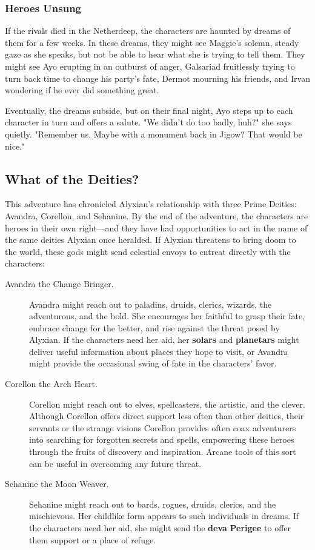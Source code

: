 \documentclass[a4paper, 11pt, bg=full, twocolumn, nooutline]{dndbook}
\begin{document}
\subsubsection{Heroes Unsung}

If the rivals died in the Netherdeep, the characters are haunted by dreams of them for a few weeks. In these dreams, they might see Maggie's solemn, steady gaze as she speaks, but not be able to hear what she is trying to tell them. They might see Ayo erupting in an outburst of anger, Galsariad fruitlessly trying to turn back time to change his party's fate, Dermot mourning his friends, and Irvan wondering if he ever did something great.

Eventually, the dreams subside, but on their final night, Ayo steps up to each character in turn and offers a salute. "We didn't do too badly, huh?" she says quietly. "Remember us. Maybe with a monument back in Jigow? That would be nice."

\subsection{What of the Deities?}

This adventure has chronicled Alyxian's relationship with three Prime Deities: Avandra, Corellon, and Sehanine. By the end of the adventure, the characters are heroes in their own right---and they have had opportunities to act in the name of the same deities Alyxian once heralded. If Alyxian threatens to bring doom to the world, these gods might send celestial envoys to entreat directly with the characters:

\begin{description}
\item[Avandra the Change Bringer.] Avandra might reach out to paladins, druids, clerics, wizards, the adventurous, and the bold. She encourages her faithful to grasp their fate, embrace change for the better, and rise against the threat posed by Alyxian. If the characters need her aid, her \textbf{solars} and \textbf{planetars} might deliver useful information about places they hope to visit, or Avandra might provide the occasional swing of fate in the characters' favor.
\item[Corellon the Arch Heart.] Corellon might reach out to elves, spellcasters, the artistic, and the clever. Although Corellon offers direct support less often than other deities, their servants or the strange visions Corellon provides often coax adventurers into searching for forgotten secrets and spells, empowering these heroes through the fruits of discovery and inspiration. Arcane tools of this sort can be useful in overcoming any future threat.
\item[Sehanine the Moon Weaver.] Sehanine might reach out to bards, rogues, druids, clerics, and the mischievous. Her childlike form appears to such individuals in dreams. If the characters need her aid, she might send the \textbf{deva} \textbf{Perigee} to offer them support or a place of refuge.
\end{description}
\end{document}
